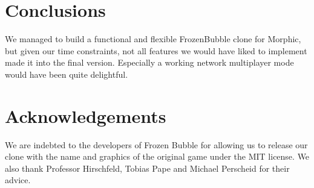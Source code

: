 \section{Conclusions}
We managed to build a functional and flexible FrozenBubble clone for Morphic,
but given our time constraints, not all features we would have liked to implement
made it into the final version. Especially a working network multiplayer mode would
have been quite delightful.

\section*{Acknowledgements}
We are indebted to the developers of Frozen Bubble for allowing us to release 
our clone with the name and graphics of the original game under the MIT 
license. We also thank Professor Hirschfeld, Tobias Pape and Michael Perscheid for 
their advice.
